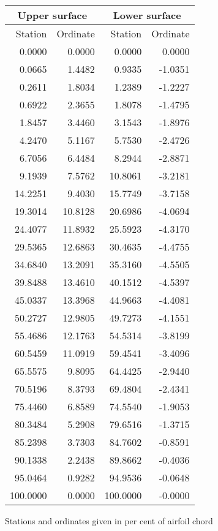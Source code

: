 \documentclass[11pt]{book}
\begin{document}
 \hspace{4mm}
 \begin{tabular}{|r|r|r|r|} \hline 
 \multicolumn{2}{|c|}{Upper surface} & \multicolumn{2}{|c|}{Lower surface} \\
 \hline
 Station & Ordinate & Station & Ordinate \\
 \hline
0.0000 & 0.0000 & 0.0000 & 0.0000 \\
0.0665 & 1.4482 & 0.9335 & -1.0351 \\
0.2611 & 1.8034 & 1.2389 & -1.2227 \\
0.6922 & 2.3655 & 1.8078 & -1.4795 \\
1.8457 & 3.4460 & 3.1543 & -1.8976 \\
4.2470 & 5.1167 & 5.7530 & -2.4726 \\
6.7056 & 6.4484 & 8.2944 & -2.8871 \\
9.1939 & 7.5762 & 10.8061 & -3.2181 \\
14.2251 & 9.4030 & 15.7749 & -3.7158 \\
19.3014 & 10.8128 & 20.6986 & -4.0694 \\
24.4077 & 11.8932 & 25.5923 & -4.3170 \\
29.5365 & 12.6863 & 30.4635 & -4.4755 \\
34.6840 & 13.2091 & 35.3160 & -4.5505 \\
39.8488 & 13.4610 & 40.1512 & -4.5397 \\
45.0337 & 13.3968 & 44.9663 & -4.4081 \\
50.2727 & 12.9805 & 49.7273 & -4.1551 \\
55.4686 & 12.1763 & 54.5314 & -3.8199 \\
60.5459 & 11.0919 & 59.4541 & -3.4096 \\
65.5575 & 9.8095 & 64.4425 & -2.9440 \\
70.5196 & 8.3793 & 69.4804 & -2.4341 \\
75.4460 & 6.8589 & 74.5540 & -1.9053 \\
80.3484 & 5.2908 & 79.6516 & -1.3715 \\
85.2398 & 3.7303 & 84.7602 & -0.8591 \\
90.1338 & 2.2438 & 89.8662 & -0.4036 \\
95.0464 & 0.9282 & 94.9536 & -0.0648 \\
100.0000 & 0.0000 & 100.0000 & -0.0000 \\
 \hline 
 \end{tabular}
 \vspace{8mm}

Stations and ordinates given in per cent of airfoil chord
\end{document}
